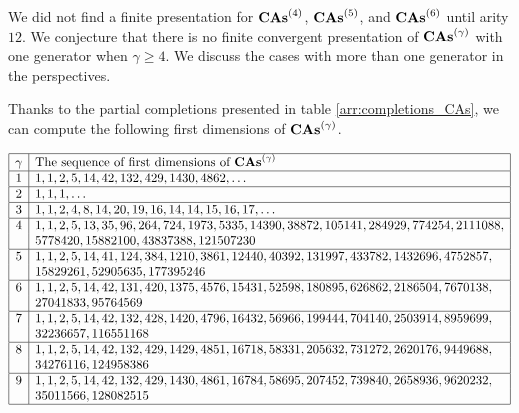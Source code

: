 We did not find a finite presentation for $\mathbf{CAs}^{\left(4\right)}$, $\mathbf{CAs}^{\left(5\right)}$, and
$\mathbf{CAs}^{\left(6\right)}$ until arity $12$. We conjecture that there is no finite
convergent presentation of $\mathbf{CAs}^{\left(\gamma\right)}$ with one generator when
$\gamma \geq 4$. We discuss the cases with more than one generator in
the perspectives.
\medbreak

Thanks to the partial completions presented in table
\eqref{arr:completions_CAs}, we can compute the following first
dimensions of $\mathbf{CAs}^{\left(\gamma\right)}$.
\begin{center}
  \begin{math} \label{arr:dimensions_CAs}
    \begin{array}{|c|l|}
      \hline
      \gamma & \mbox{The sequence of first dimensions of }
       \mathbf{CAs}^{\left(\gamma\right)}\\ \hline
      1 & 1, 1, 2, 5, 14, 42, 132, 429, 1430, 4862, \dots \\ \hline
      2 & 1, 1, 1, \dots \\ \hline
      3 & 1, 1, 2, 4, 8, 14, 20, 19, 16, 14, 
          14, 15, 16, 17, \dots \\ \hline
      4 & 1, 1, 2, 5, 13, 35, 96, 264, 724, 1973, 5335, 14390, 38872,
          105141, 284929, 774254, 2111088,\\
        & 5778420, 15882100, 43837388, 121507230 \\ \hline
      5 & 1, 1, 2, 5, 14, 41, 124, 384, 1210, 3861, 12440, 40392, 131997,
          433782, 1432696, 4752857, \\
        & 15829261, 52905635, 177395246 \\ \hline
      6 & 1, 1, 2, 5, 14, 42, 131, 420, 1375, 4576, 15431, 52598, 180895,
          626862, 2186504, 7670138, \\
        & 27041833, 95764569 \\ \hline
      7 & 1, 1, 2, 5, 14, 42, 132, 428, 1420, 4796, 16432, 56966, 199444,
          704140, 2503914, 8959699, \\
        & 32236657, 116551168\\ \hline
      8 & 1, 1, 2, 5, 14, 42, 132, 429, 1429, 4851, 16718, 58331, 205632,
          731272, 2620176, 9449688, \\
        & 34276116, 124958386\\ \hline
      9 & 1, 1, 2, 5, 14, 42, 132, 429, 1430, 4861, 16784, 58695, 207452,
          739840, 2658936, 9620232, \\
        & 35011566, 128082515\\ \hline
    \end{array}
  \end{math}
\end{center}
\medbreak

